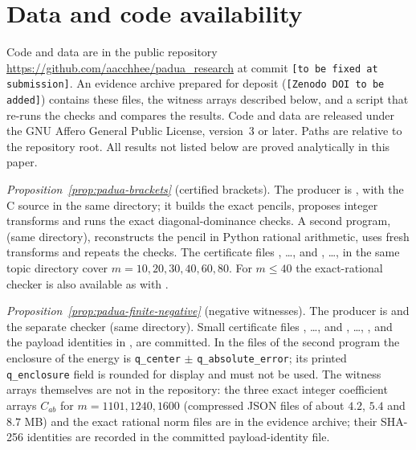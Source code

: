 \documentclass[preprint,12pt,a4paper]{elsarticle}
\theoremstyle{remark}
\begin{document}
\section*{Data and code availability}
\begingroup\raggedright
Code and data are in the public repository
\url{https://github.com/aacchhee/padua_research} at commit
\texttt{[to be fixed at submission]}. An evidence archive prepared for deposit
(\texttt{[Zenodo DOI to be added]}) contains these files, the witness arrays
described below, and a script that re-runs the checks and compares the results.
Code and data are released under the GNU Affero General Public License,
version~3 or later.
Paths are relative to the repository root. All results not listed below are
proved analytically in this paper.

\emph{Proposition~\ref{prop:padua-brackets}} (certified brackets). The producer
is , with the C
source  in the same directory; it builds the exact pencils,
proposes integer transforms and runs the exact diagonal-dominance checks. A second
program,  (same directory), reconstructs the pencil in
Python rational arithmetic, uses fresh transforms and repeats the checks. The
certificate files , \dots, 
and , \dots,
 in the same topic directory cover
$m=10,20,30,40,60,80$. For $m\le40$ the exact-rational checker is also available
as  with
.

\emph{Proposition~\ref{prop:padua-finite-negative}} (negative witnesses).
The producer is 
and the separate checker  (same directory). Small
certificate files , \dots, 
and , \dots, , and the
payload identities in , are
committed. In the files of the second program the enclosure of the energy is
\texttt{q\_center} $\pm$ \texttt{q\_absolute\_error}; its printed
\texttt{q\_enclosure} field is rounded for display and must not be used. The witness
arrays themselves are not in the repository: the three exact integer coefficient
arrays $C_{ab}$ for $m=1101,1240,1600$ (compressed JSON files of about $4.2$,
$5.4$ and $8.7$ MB) and the exact rational norm files are in the evidence archive;
their SHA-256 identities are recorded in the committed payload-identity file.
\end{document}

